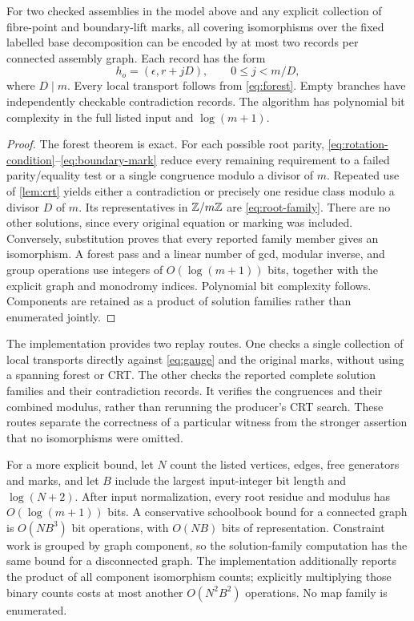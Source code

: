 \begin{theorem}
\label{thm:gluing}
For two checked assemblies in the model above and any explicit collection
of fibre-point and boundary-lift marks, all covering isomorphisms over the
fixed labelled base decomposition can be encoded by at most two records
per connected assembly graph. Each record has the form
\begin{equation}
 h_o=(\epsilon,r+jD),\qquad 0\leq j<m/D,
 \label{eq:root-family}
\end{equation}
where $D\mid m$. Every local transport follows from \eqref{eq:forest}. Empty branches
have independently checkable contradiction records. The algorithm has
polynomial bit complexity in the full listed input and $\log(m+1)$.
\end{theorem}
\begin{proof}
The forest theorem is exact. For each possible root parity, \eqref{eq:rotation-condition}--\eqref{eq:boundary-mark}
reduce every remaining requirement to a failed parity/equality test or a
single congruence modulo a divisor of $m$. Repeated use of
\cref{lem:crt} yields either a contradiction or precisely one residue class
modulo a divisor $D$ of $m$. Its representatives in $\mathbb Z/m\mathbb Z$ are \eqref{eq:root-family}.
There are no other solutions, since every original equation or marking was
included. Conversely, substitution proves that every reported family member
gives an isomorphism. A forest pass and a linear number of gcd, modular
inverse, and group operations use integers of $O(\log(m+1))$ bits, together
with the explicit graph and monodromy indices. Polynomial bit complexity
follows. Components are retained as a product of solution families rather
than enumerated jointly.
\end{proof}

The implementation provides two replay routes. One checks a single collection
of local transports directly against \eqref{eq:gauge} and the original marks, without
using a spanning forest or CRT. The other checks the reported complete
solution families and their contradiction records. It verifies the
congruences and their combined modulus, rather than rerunning the producer's
CRT search. These routes separate the correctness of a particular witness
from the stronger assertion that no isomorphisms were omitted.

For a more explicit bound, let $N$ count the listed vertices, edges, free
generators and marks, and let $B$ include the largest input-integer bit
length and $\log(N+2)$. After input normalization, every root residue and
modulus has $O(\log(m+1))$ bits. A conservative schoolbook bound for a
connected graph is $O(NB^3)$ bit operations, with $O(NB)$ bits of
representation. Constraint work is grouped by graph component, so the
solution-family computation has the same bound for a disconnected graph.
The implementation additionally reports the product of all component
isomorphism counts; explicitly multiplying those binary counts costs at
most another $O(N^2B^2)$ operations. No map family is enumerated.

